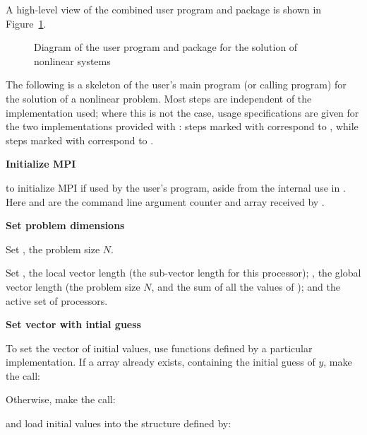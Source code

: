 A high-level view of the combined user program and {\kinsol} package is
shown in Figure~\ref{f:sim_overview}.
\begin{figure}
\centerline{}
\caption {Diagram of the user program and 
  {\kinsol} package for the solution of nonlinear systems}\label{f:sim_overview}
\end{figure}
The following is a skeleton of the user's main program (or calling
program) for the solution of a nonlinear problem. 
Most steps are independent of the {\nvector} implementation used; 
where this is not the case, usage specifications are given for the two implementations 
provided with {\kinsol}: steps marked with {\p} correspond to 
{\nvecp}, while steps marked with {\s} correspond to {\nvecs}.
%
\begin{Steps}
  
\item 
  {\bf Initialize MPI}

  {\p}  to initialize MPI if used by
  the user's program, aside from the internal use in {\nvecp}.  
  Here  and  are the command line argument 
  counter and array received by .
  
\item
  {\bf Set problem dimensions}

  {\s} Set , the problem size $N$.

  {\p} Set , the local vector length (the sub-vector
  length for this processor); , the global vector length (the
  problem size $N$, and the sum of all the values of );
  and the active set of processors.
  
\item
  {\bf Set vector with intial guess}
 
  To set the vector  of initial values, use functions defined by a
  particular {\nvector} implementation.  If a  array  
  already exists, containing the initial guess of $y$, make the call:

  {\s} 

  {\p} 

  Otherwise, make the call:

  {\s} 

  {\p} 

  and load initial values into the structure defined by:


\end{Steps}
